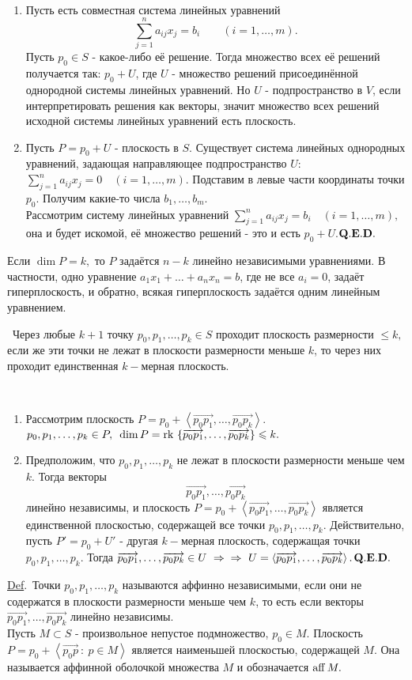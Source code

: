 \documentclass[draft]{article}%
\newcommand{\de}{\par\noindent\underline{Def}.\ }%
\newcommand{\te}{\par\noindent{\bf Теорема.}\ }%
\newcommand{\dok}{\par\noindent{\textsl{Доказательство}.}\ }%
\newcommand{\qed}{\quad${{\bf Q.E.D.}}$}
\newcommand{\lob}[1]{\left\langle#1\right\rangle}%
\newcommand{\rom}[1]{{\rm#1\,}}
\newcommand{\oi}[1]{\overrightarrow{#1}}%
\renewcommand{\le}{\leqslant}
\begin{document}
\dok \begin{enumerate}
    \item Пусть есть совместная система линейных уравнений
    $$
    \sum_{j=1}^na_{ij}x_j=b_i\qquad(i=1,\dots,m).
    $$
    Пусть $p_0\in S$ - какое-либо её решение. Тогда множество всех её решений получается так: $p_0+U$, где
    $U$ - множество решений присоединённой однородной системы линейных уравнений. Но $U$ - подпространство в
    $V$, если интерпретировать решения как векторы, значит множество всех решений исходной системы линейных
    уравнений есть плоскость.
    \item Пусть $P=p_0+U$ - плоскость в $S$. Существует система линейных однородных уравнений, задающая
    направляющее подпространство $U$: $\sum\limits_{j=1}^na_{ij}x_j=0\quad(i=1,\dots,m)$. Подставим в левые части
    координаты точки $p_0.$ Получим какие-то числа $b_1,\dots,b_m.$\\ Рассмотрим систему линейных уравнений
    $\sum\limits_{j=1}^na_{ij}x_j=b_i\quad(i=1,\dots,m),$ она и будет искомой, её множество решений - это и есть $p_0+U.$\qed
\end{enumerate}
Если $\dim P=k,$ то $P$ задаётся $n-k$ линейно независимыми уравнениями. В частности, одно уравнение
$a_1x_1+\dots+a_nx_n=b$, где не все $a_i=0$, задаёт гиперплоскость, и обратно, всякая гиперплоскость задаётся
одним линейным уравнением. %
\te Через любые $k+1$ точку $p_0,p_1,\dots,p_k\in S$ проходит плоскость размерности $\le k,$ если же эти точки не
лежат в плоскости размерности меньше $k$, то через них проходит единственная $k-$мерная плоскость. %
\dok \begin{enumerate}
    \item Рассмотрим плоскость $P=p_0+\lob{\oi{p_0p_1},\dots,\oi{p_0p_k}}$. $p_0,p_1,\dots,p_k\in P,\\\ \dim P=\rom{rk}\left
    \{\oi{p_0p_1},\dots,\oi{p_0p_k}\right\}\le k.$
    \item Предположим, что $p_0,p_1,\dots,p_k$ не лежат в плоскости размерности меньше чем $k$. Тогда векторы
    $$\oi{p_0p_1},\dots,\oi{p_0p_k}$$ линейно независимы, и плоскость $P=p_0+\lob{\oi{p_0p_1},\dots,\oi{p_0p_k}}$
    является единственной плоскостью, содержащей все точки $p_0,p_1,\dots,p_k$. Действительно, пусть $P'=p_0+U'$ -
    другая $k-$мерная плоскость, содержащая точки $p_0,p_1,\dots,p_k$. Тогда $\oi{p_0p_1},\dots,\oi{p_0p_k}\in U\ \Rightarrow\\
    \Rightarrow\ U=\lob{\oi{p_0p_1},\dots,\oi{p_0p_k}}.$\qed
\end{enumerate}
\de Точки $p_0,p_1,\dots,p_k$ называются аффинно независимыми, если они не содержатся в плоскости размерности
меньше чем $k$, то есть если векторы $\oi{p_0p_1},\dots,\oi{p_0p_k}$ линейно независимы.\\%
Пусть $M\subset S$ - произвольное непустое подмножество, $p_0\in M.$ Плоскость $P=p_0+\lob{\oi{p_0p}\ :\ p\in M}$
является наименьшей плоскостью, содержащей $M$. Она называется аффинной оболочкой множества $M$ и
обозначается $\rom{aff}M.$%
\end{document}
